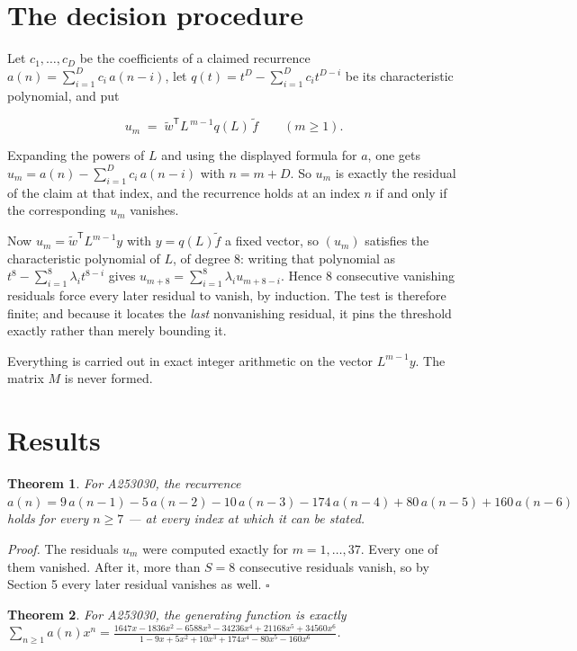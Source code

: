 \documentclass[11pt]{article}
\newtheorem{theorem}{Theorem}
\theoremstyle{definition}
\begin{document}
\section{The decision procedure}

Let $c_1,\dots,c_D$ be the coefficients of a claimed recurrence $a(n) = \sum_{i=1}^{D} c_i\,a(n-i)$, let $q(t) = t^{D} - \sum_{i=1}^{D} c_i t^{D-i}$ be its characteristic polynomial, and put

\[u_m \;=\; \tilde w^{\mathsf T} L^{\,m-1} q(L)\,\tilde f \qquad (m \ge 1).\]

Expanding the powers of $L$ and using the displayed formula for $a$, one gets $u_m = a(n) - \sum_{i=1}^{D} c_i\,a(n-i)$ with $n = m + D$. So $u_m$ is exactly the residual of the claim at that index, and the recurrence holds at an index $n$ if and only if the corresponding $u_m$ vanishes.

Now $u_m = \tilde w^{\mathsf T} L^{m-1} y$ with $y = q(L)\tilde f$ a fixed vector, so $(u_m)$ satisfies the characteristic polynomial of $L$, of degree $8$: writing that polynomial as $t^{8} - \sum_{i=1}^{8} \lambda_i t^{8-i}$ gives $u_{m+8} = \sum_{i=1}^{8} \lambda_i u_{m+8-i}$. Hence $8$ consecutive vanishing residuals force every later residual to vanish, by induction. The test is therefore finite; and because it locates the {\itshape last} nonvanishing residual, it pins the threshold exactly rather than merely bounding it.

Everything is carried out in exact integer arithmetic on the vector $L^{m-1}y$. The matrix $M$ is never formed.

\section{Results}

\begin{theorem} For A253030, the recurrence $a(n) = 9\,a(n-1) - 5\,a(n-2) - 10\,a(n-3) - 174\,a(n-4) + 80\,a(n-5) + 160\,a(n-6)$ holds for every $n \ge 7$ --- at every index at which it can be stated.\end{theorem}

{\itshape Proof.} The residuals $u_m$ were computed exactly for $m = 1,\dots,37$. Every one of them vanished. After it, more than $S = 8$ consecutive residuals vanish, so by Section 5 every later residual vanishes as well. $\square$

\begin{theorem} For A253030, the generating function is exactly $\sum_{n\ge 1} a(n)x^n = \frac{1647x - 1836x^{2} - 6588x^{3} - 34236x^{4} + 21168x^{5} + 34560x^{6}}{1 - 9x + 5x^{2} + 10x^{3} + 174x^{4} - 80x^{5} - 160x^{6}}$.\end{theorem}
\end{document}
